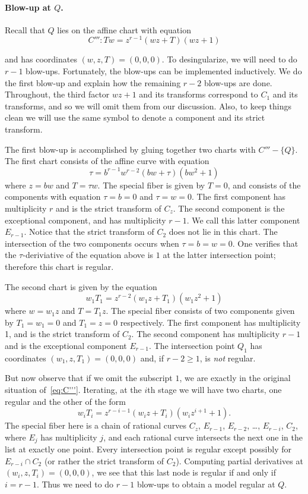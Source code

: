 \documentclass{article}
\theoremstyle{plain}
\theoremstyle{definition}
\theoremstyle{remark}
\begin{document}
\paragraph{Blow-up at $Q$.}
\label{sec:blow-up-Q}

Recall that $Q$ lies on the affine chart with equation
\begin{equation}
  C''':Tw = z^{r-1}(wz + T)(wz + 1)\label{eq:C'''}
\end{equation}

and has coordinates $(w,z,T) = (0,0,0)$. To desingularize, we will need to do $r-1$ blow-ups. Fortunately, the blow-ups can be implemented inductively. We do the first blow-up and explain how the remaining $r-2$ blow-ups are done. Throughout, the third factor $wz + 1$ and its transforms correspond to $C_1$ and its transforms, and so we will omit them from our discussion. Also, to keep things clean we will use the same symbol to denote a component and its strict transform.

The first blow-up is accomplished by gluing together two charts with $C'''-\{Q\}$. The first chart consists of the affine curve with equation
\[
\tau = b^{r-1} w^{r-2} (bw + \tau) (b w^2 + 1)
\]
where $z = bw$ and $T = \tau w$. The special fiber is given by $T = 0$, and consists of the components with equation $\tau = b = 0$ and $\tau = w = 0$. The first component has multiplicity $r$ and is the strict transform of ${C_z}$. The second component is the exceptional component, and has multiplicity $r-1$. We call this latter component $E_{r-1}$. Notice that the strict transform of $C_2$ does not lie in this chart. The intersection of the two components occurs when $\tau = b = w = 0$. One verifies that the $\tau$-deriviative of the equation above is $1$ at the latter intersection point; therefore this chart is regular.

The second chart is given by the equation
\[
w_1 T_1 = z^{r-2}(w_1z + T_1)(w_1 z^2 + 1)
\]
where $w = w_1 z$ and $T = T_1 z$. The special fiber consists of two components given by $T_1 = w_1 = 0$ and $T_1 = z = 0$ respectively. The first component has multiplicity 1, and is the strict transform of $C_2$. The second component has multiplicity $r-1$ and is the exceptional component $E_{r-1}$. The intersection point $Q_1$ has coordinates $(w_1, z, T_1) = (0,0,0)$ and, if $r - 2 \geq 1$, is \emph{not} regular.

But now observe that if we omit the subscript $1$, we are exactly in the original situation of~\eqref{eq:C'''}. Iterating, at the $i$th stage we will have two charts, one regular and the other of the form
\[
w_i T_i = z^{r-i-1}(w_iz + T_i)(w_i z^{i+1} + 1).
\]
The special fiber here is a chain of rational curves ${C_z}$, $E_{r-1}$, $E_{r-2}$, \dots, $E_{r-i}$, ${C_2}$, where $E_j$ has multiplicity $j$, and each rational curve intersects the next one in the list at exactly one point. Every intersection point is regular except possibly for $E_{r-i} \cap C_2$ (or rather the strict transform of $C_2$). Computing partial derivatives at $(w_i, z, T_i) = (0,0,0)$, we see that this last node is regular if and only if $i = r - 1$. Thus we need to do $r - 1$ blow-ups to obtain a model regular at $Q$.
\end{document}
